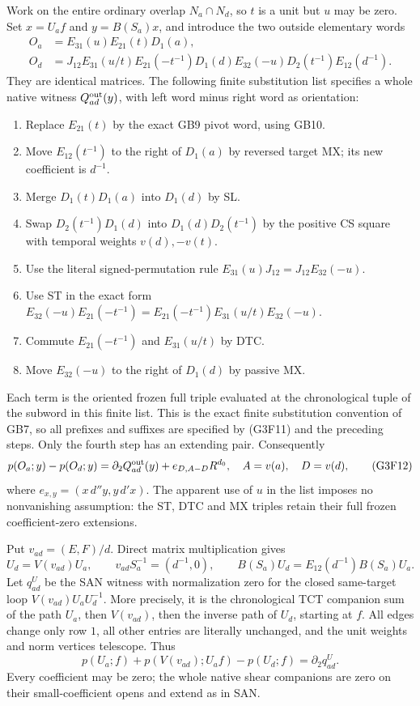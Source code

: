 Work on the entire ordinary overlap $N_a\cap N_d$, so $t$ is a unit
but $u$ may be zero.  Set $x=U_af$ and $y=B(S_a)x$, and introduce
the two outside elementary words
\[
 \begin{split}
 O_a&=E_{31}(u)E_{21}(t)D_1(a),\\
 O_d&=J_{12}E_{31}(u/t)E_{21}(-t^{-1})D_1(d)
                  E_{32}(-u)D_2(t^{-1})E_{12}(d^{-1}).
 \end{split}
 \tag{G3F11}
\]
They are identical matrices.  The following finite substitution
list specifies a whole native witness $Q^{\rm out}_{ad}(y)$,
with left word minus right word as orientation:
\begin{enumerate}
\item Replace $E_{21}(t)$ by the exact GB9 pivot word, using GB10.
\item Move $E_{12}(t^{-1})$ to the right of $D_1(a)$ by reversed
      target MX; its new coefficient is $d^{-1}$.
\item Merge $D_1(t)D_1(a)$ into $D_1(d)$ by SL.
\item Swap $D_2(t^{-1})D_1(d)$ into $D_1(d)D_2(t^{-1})$ by
      the positive CS square with temporal weights $v(d),-v(t)$.
\item Use the literal signed-permutation rule
      $E_{31}(u)J_{12}=J_{12}E_{32}(-u)$.
\item Use ST in the exact form
      $E_{32}(-u)E_{21}(-t^{-1})
       =E_{21}(-t^{-1})E_{31}(u/t)E_{32}(-u)$.
\item Commute $E_{21}(-t^{-1})$ and $E_{31}(u/t)$ by DTC.
\item Move $E_{32}(-u)$ to the right of $D_1(d)$ by passive MX.
\end{enumerate}
Each term is the oriented frozen full triple evaluated at the
chronological tuple of the subword in this finite list.  This is
the exact finite substitution convention of GB7, so all prefixes
and suffixes are specified by (G3F11) and the preceding steps.
Only the fourth step has an extending pair.  Consequently
\[
 p(O_a;y)-p(O_d;y)
      =\partial_2Q^{\rm out}_{ad}(y)
                    +e_{D,A-D}R^{d_0},
 \quad A=v(a),\quad D=v(d),
 \tag{G3F12}
\]
where $e_{x,y}=(x\,d''y,y\,d'x)$.  The apparent use of $u$ in
the list imposes no nonvanishing assumption: the ST, DTC and MX
triples retain their full frozen coefficient-zero extensions.

Put $v_{ad}=(E,F)/d$.  Direct matrix multiplication gives
\[
 U_d=V(v_{ad})U_a,\qquad
 v_{ad}S_a^{-1}=(d^{-1},0),\qquad
 B(S_a)U_d=E_{12}(d^{-1})B(S_a)U_a.
 \tag{G3F13}
\]
Let $q^U_{ad}$ be the SAN witness with normalization zero for
the closed same-target loop
$V(v_{ad})U_aU_d^{-1}$.  More precisely, it is the chronological
TCT companion sum of the path $U_a$, then $V(v_{ad})$, then
the inverse path of $U_d$, starting at $f$.  All edges change
only row $1$, all other entries are literally unchanged, and
the unit weights and norm vertices telescope.  Thus
\[
 p(U_a;f)+p(V(v_{ad});U_af)-p(U_d;f)=\partial_2q^U_{ad}.
 \tag{G3F14}
\]
Every coefficient may be zero; the whole native shear companions
are zero on their small-coefficient opens and extend as in SAN.

